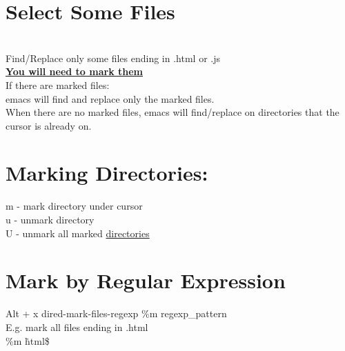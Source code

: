 \documentclass{article}
\begin{document}
\section{Select Some Files}
\\
Find/Replace only some files ending in .html or .js
\\
\textbf{\underline{You will need to mark them}}
\\
If there are marked files:
\\
emacs will find and replace only the marked files.
\\
When there are no marked files, emacs will find/replace on directories that the cursor is already on.
\\
\section{Marking Directories:}
m - mark directory under cursor
\\
u - unmark directory
\\
U - unmark all marked \underline{directories}
\\
\section{Mark by Regular Expression}
Alt + x dired-mark-files-regexp \%m \<regexp\_pattern\>
\\
E.g. mark all files ending in .html 
\\
\%m \.html\$
\\
\end{document}
